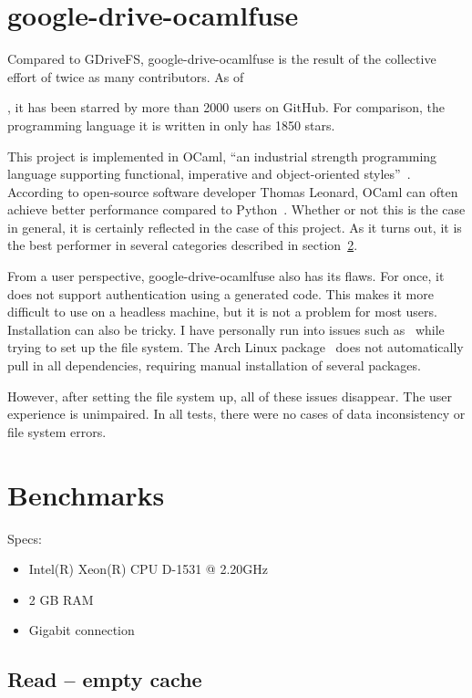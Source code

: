 \section{google-drive-ocamlfuse}

Compared to GDriveFS, google-drive-ocamlfuse is the result of the collective effort of twice as many contributors. As of \date{June 2018}, it has been starred by more than 2000 users on GitHub. For comparison, the programming language it is written in only has 1850 stars.~\cite{ocaml}

This project is implemented in OCaml, ``an industrial strength programming language supporting functional, imperative and object-oriented styles''~\cite{ocaml-website}. According to open-source software developer Thomas Leonard, OCaml can often achieve better performance compared to Python~\cite{python_to_ocaml_retrospective}. Whether or not this is the case in general, it is certainly reflected in the case of this project. As it turns out, it is the best performer in several categories described in section~\ref{benchmarks}.

From a user perspective, google-drive-ocamlfuse also has its flaws. For once, it does not support authentication using a generated code. This makes it more difficult to use on a headless machine, but it is not a problem for most users. Installation can also be tricky. I have personally run into issues such as~\cite{opam-depext-issue} while trying to set up the file system. The Arch Linux package~\cite{google-drive-ocamlfuse-aur} does not automatically pull in all dependencies, requiring manual installation of several packages.

However, after setting the file system up, all of these issues disappear. The user experience is unimpaired. In all tests, there were no cases of data inconsistency or file system errors.

\section{Benchmarks} \label{benchmarks}

Specs:
\begin{itemize}
  \itemsep0em
  \item Intel(R) Xeon(R) CPU D-1531 @ 2.20GHz
  \item 2 GB RAM
  \item Gigabit connection
\end{itemize}

\subsection{Read -- empty cache}

